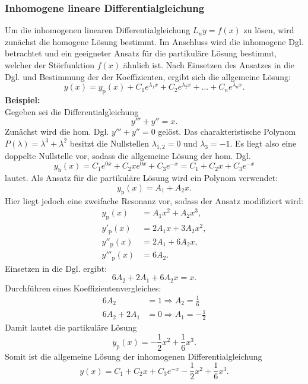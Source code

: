 \subsubsection*{Inhomogene lineare Differentialgleichung}
Um die inhomogenen linearen Differentialgleichung $L_n y = f(x)$ zu l\"osen, wird zun\"achst die homogene L\"osung bestimmt. Im Anschluss wird die inhomogene Dgl. betrachtet und ein geeigneter Ansatz f\"ur die partikul\"are L\"osung bestimmt, welcher der St\"orfunktion $f(x)$ \"ahnlich ist. Nach Einsetzen des Ansatzes in die Dgl. und Bestimmung der der Koeffizienten, ergibt sich die allgemeine L\"osung:
$$
y(x)   =y_{\text{p}}(x)+ C_1  e^{\lambda_1 x} + C_2 e^{\lambda_2 x}  + ... + C_n e^{\lambda_n x} .
$$
\newpage
\noindent
\textbf{Beispiel:}\\
Gegeben sei die Differentialgleichung
$$
y'''+y'' = x.
$$
Zun\"achst wird die hom. Dgl. $y'''+y'' =0$ gel\"ost.
Das charakteristische Polynom $P(\lambda) = \lambda^3 +\lambda^2$ besitzt die Nullstellen $\lambda_{1,2} = 0$ und $\lambda_3=-1$. Es liegt also eine doppelte Nullstelle vor, sodass die allgemeine L\"osung der hom. Dgl.
$$
y_{\text{h}}(x) = C_1 e^{0x} + C_2 x e^{0x}+ C_3 e^{-x} = C_1 + C_2 x + C_3 e^{-x}
$$
lautet.
Als Ansatz f\"ur die partikul\"are L\"osung wird ein Polynom verwendet:
$$
y_{\text{p}}(x) = A_1 + A_2 x.
$$
Hier liegt jedoch eine zweifache Resonanz vor, sodass der Ansatz modifiziert wird:
\begin{align*}
y_{\text{p}}(x) &= A_1 x^2 + A_2 x^3,\\
y'_{\text{p}}(x) &= 2 A_1x +3 A_2x^2, \\
y''_{\text{p}}(x) &= 2 A_1 +6 A_2 x, \\
y'''_{\text{p}}(x) &= 6 A_2.
\end{align*}
Einsetzen in die Dgl. ergibt:
$$
6 A_2 +2 A_1 +6 A_2 x = x.
$$
Durchf\"uhren eines Koeffizientenvergleiches:
\begin{align*}
6 A_2 &= 1 \Rightarrow A_2 = \frac{1}{6}\\
6A_2+2A_1 &= 0 \Rightarrow A_1 = - \frac{1}{2}
\end{align*}
Damit lautet die partikul\"are L\"osung
$$
y_{\text{p}}(x) = - \frac{1}{2} x^2 +  \frac{1}{6} x^3.
$$
Somit ist die allgemeine L\"osung der inhomogenen Differentialgleichung
$$
y(x) = C_1 + C_2 x + C_3 e^{-x}- \frac{1}{2} x^2 +  \frac{1}{6} x^3.
$$
